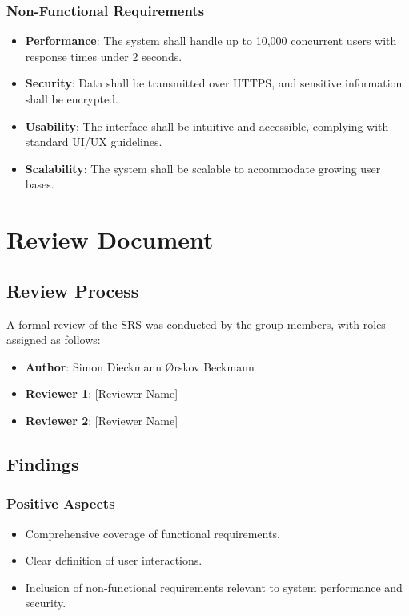 \documentclass[12pt,a4paper]{report}
\begin{document}
\subsection{Non-Functional Requirements}
\begin{itemize}
    \item \textbf{Performance}: The system shall handle up to 10,000 concurrent users with response times under 2 seconds.
    \item \textbf{Security}: Data shall be transmitted over HTTPS, and sensitive information shall be encrypted.
    \item \textbf{Usability}: The interface shall be intuitive and accessible, complying with standard UI/UX guidelines.
    \item \textbf{Scalability}: The system shall be scalable to accommodate growing user bases.
\end{itemize}

\chapter{Review Document}
\section{Review Process}
A formal review of the SRS was conducted by the group members, with roles assigned as follows:
\begin{itemize}
    \item \textbf{Author}: Simon Dieckmann Ørskov Beckmann
    \item \textbf{Reviewer 1}: [Reviewer Name]
    \item \textbf{Reviewer 2}: [Reviewer Name]
\end{itemize}

\section{Findings}
\subsection{Positive Aspects}
\begin{itemize}
    \item Comprehensive coverage of functional requirements.
    \item Clear definition of user interactions.
    \item Inclusion of non-functional requirements relevant to system performance and security.
\end{itemize}
\end{document}
